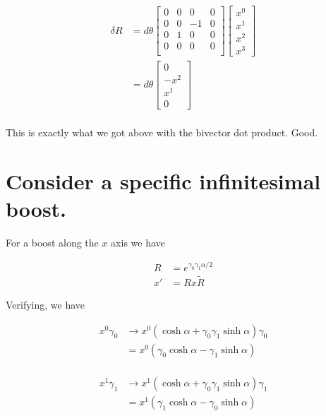\begin{align*}
\delta R &= d\theta
\begin{bmatrix}
0 & 0 & 0 & 0 \\
0 & 0 & -1 & 0 \\
0 & 1 & 0 & 0 \\
0 & 0 & 0 & 0 \\
\end{bmatrix} 
\begin{bmatrix}
x^0 \\
x^1 \\
x^2 \\
x^3
\end{bmatrix} \\
&=
d\theta
\begin{bmatrix}
0 \\
-x^2 \\
x^1 \\
0
\end{bmatrix} \\
\end{align*}

This is exactly what we got above with the bivector dot product.  Good.

\section{Consider a specific infinitesimal boost.}

For a boost along the $x$ axis we have

\begin{align}
R &= e^{\gamma_0\gamma_1 \alpha/2} \\
x' &= R x \tilde{R}
\end{align}

Verifying, we have

\begin{align*}
x^0 \gamma_0 
&\rightarrow x^0 ( \cosh\alpha + \gamma_0 \gamma_1 \sinh\alpha ) \gamma_0 \\
&= x^0 ( \gamma_0 \cosh\alpha - \gamma_1 \sinh\alpha ) \\
\end{align*}

\begin{align*}
x^1 \gamma_1 
&\rightarrow x^1 ( \cosh\alpha + \gamma_0 \gamma_1 \sinh\alpha ) \gamma_1 \\
&= x^1 ( \gamma_1 \cosh\alpha - \gamma_0 \sinh\alpha ) \\
\end{align*}

